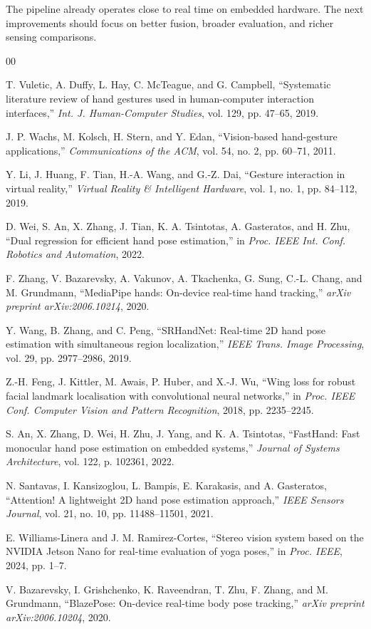 \documentclass[10pt,letterpaper]{article}
\begin{document}
The pipeline already operates close to real time on embedded hardware. The next improvements should focus on better fusion, broader evaluation, and richer sensing comparisons.

\clearpage
\begin{thebibliography}{00}

T. Vuletic, A. Duffy, L. Hay, C. McTeague, and G. Campbell, ``Systematic literature review of hand gestures used in human-computer interaction interfaces,'' \emph{Int. J. Human-Computer Studies}, vol. 129, pp. 47--65, 2019.

J. P. Wachs, M. Kolsch, H. Stern, and Y. Edan, ``Vision-based hand-gesture applications,'' \emph{Communications of the ACM}, vol. 54, no. 2, pp. 60--71, 2011.

Y. Li, J. Huang, F. Tian, H.-A. Wang, and G.-Z. Dai, ``Gesture interaction in virtual reality,'' \emph{Virtual Reality \& Intelligent Hardware}, vol. 1, no. 1, pp. 84--112, 2019.

D. Wei, S. An, X. Zhang, J. Tian, K. A. Tsintotas, A. Gasteratos, and H. Zhu, ``Dual regression for efficient hand pose estimation,'' in \emph{Proc. IEEE Int. Conf. Robotics and Automation}, 2022.

F. Zhang, V. Bazarevsky, A. Vakunov, A. Tkachenka, G. Sung, C.-L. Chang, and M. Grundmann, ``MediaPipe hands: On-device real-time hand tracking,'' \emph{arXiv preprint arXiv:2006.10214}, 2020.

Y. Wang, B. Zhang, and C. Peng, ``SRHandNet: Real-time 2D hand pose estimation with simultaneous region localization,'' \emph{IEEE Trans. Image Processing}, vol. 29, pp. 2977--2986, 2019.

Z.-H. Feng, J. Kittler, M. Awais, P. Huber, and X.-J. Wu, ``Wing loss for robust facial landmark localisation with convolutional neural networks,'' in \emph{Proc. IEEE Conf. Computer Vision and Pattern Recognition}, 2018, pp. 2235--2245.

S. An, X. Zhang, D. Wei, H. Zhu, J. Yang, and K. A. Tsintotas, ``FastHand: Fast monocular hand pose estimation on embedded systems,'' \emph{Journal of Systems Architecture}, vol. 122, p. 102361, 2022.

N. Santavas, I. Kansizoglou, L. Bampis, E. Karakasis, and A. Gasteratos, ``Attention! A lightweight 2D hand pose estimation approach,'' \emph{IEEE Sensors Journal}, vol. 21, no. 10, pp. 11488--11501, 2021.

E. Williams-Linera and J. M. Ramirez-Cortes, ``Stereo vision system based on the NVIDIA Jetson Nano for real-time evaluation of yoga poses,'' in \emph{Proc. IEEE}, 2024, pp. 1--7.

V. Bazarevsky, I. Grishchenko, K. Raveendran, T. Zhu, F. Zhang, and M. Grundmann, ``BlazePose: On-device real-time body pose tracking,'' \emph{arXiv preprint arXiv:2006.10204}, 2020.

\end{thebibliography}
\end{document}
